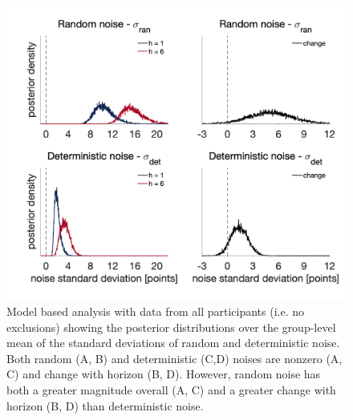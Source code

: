 \documentclass[12pt]{article}
\begin{document}
	\begin{figure}[H]
		\begin{center}
			\includegraphics[width=1\textwidth]{figures/RanDetNoise_hyperprior_all.png}
			\caption{Model based analysis with data from all participants (i.e. no exclusions) showing the posterior distributions over the group-level mean of the standard deviations of  random and deterministic noise. Both random (A, B) and deterministic (C,D) noises are nonzero (A, C) and change with horizon (B, D).  However, random noise has both a greater magnitude overall (A, C) and a greater change with horizon (B, D) than deterministic noise.}
			\label{fig:mb12}
		\end{center}
	\end{figure}
	
\end{document}
